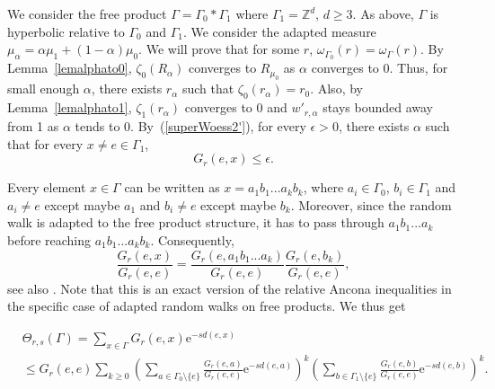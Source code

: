\documentclass{amsart}
\theoremstyle{definition}
\theoremstyle{remark}
\begin{document}
We consider the free product $\Gamma=\Gamma_0*\Gamma_1$ where $\Gamma_1=\mathbb{Z}^d$, $d\geq 3$.
As above, $\Gamma$ is hyperbolic relative to $\Gamma_0$ and $\Gamma_1$.
We consider the adapted measure $\mu_\alpha=\alpha \mu_1+(1-\alpha)\mu_0$.
We will prove that for some $r$, $\omega_{\Gamma_0}(r)=\omega_\Gamma(r)$.
By Lemma~\ref{lemalphato0}, $\zeta_0(R_\alpha)$ converges to $R_{\mu_0}$ as $\alpha$ converges to 0.
Thus, for small enough $\alpha$, there exists $r_\alpha$ such that $\zeta_0(r_\alpha)=r_0$.
Also, by Lemma~\ref{lemalphato1}, $\zeta_1(r_\alpha)$ converges to 0 and $w'_{r,\alpha}$ stays bounded away from 1 as $\alpha$ tends to 0.
By~(\ref{superWoess2'}), for every $\epsilon>0$, there exists $\alpha$ such that for every $x\neq e\in \Gamma_1$,
\begin{equation}\label{smallGs}
G_r(e,x)\leq \epsilon.
\end{equation}

Every element $x\in \Gamma$ can be written as $x=a_1b_1...a_kb_k$, where $a_i\in \Gamma_0$, $b_i\in \Gamma_1$ and $a_i\neq e$ except maybe $a_1$ and $b_i\neq e$ except maybe $b_k$.
Moreover, since the random walk is adapted to the free product structure, it has to pass through $a_1b_1...a_k$ before reaching $a_1b_1...a_kb_k$.
Consequently,
$$\frac{G_r(e,x)}{G_r(e,e)}=\frac{G_r(e,a_1b_1...a_k)}{G_r(e,e)}\frac{G_r(e,b_k)}{G_r(e,e)},$$
see also \cite[(3.3)]{WoessMartin}.
Note that this is an exact version of the relative Ancona inequalities in the specific case of adapted random walks on free products.
We thus get

\begin{equation}\label{boundPoincare}
\begin{split}
&\Theta_{r,s}(\Gamma)=\sum_{x\in \Gamma}G_r(e,x)\mathrm{e}^{-sd(e,x)}\\
&\leq G_r(e,e)\sum_{k\geq 0}\left (\sum_{a\in \Gamma_0\setminus\{e\}}\frac{G_r(e,a)}{G_r(e,e)}\mathrm{e}^{-sd(e,a)}\right )^k\left (\sum_{b\in \Gamma_1\setminus\{e\}}\frac{G_r(e,b)}{G_r(e,e)}\mathrm{e}^{-sd(e,b)}\right )^k.
\end{split}
\end{equation}
\end{document}
